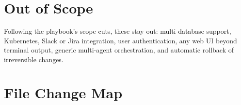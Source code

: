 \documentclass[11pt,a4paper]{article}
\begin{document}
\section{Out of Scope}
Following the playbook's scope cuts, these stay out: multi-database support,
Kubernetes, Slack or Jira integration, user authentication, any web UI beyond terminal output,
generic multi-agent orchestration, and automatic rollback of irreversible changes.

\appendix
\section{File Change Map}
\end{document}
